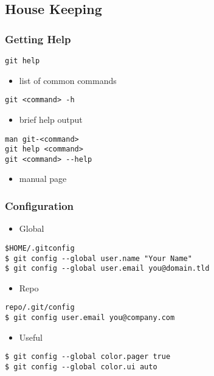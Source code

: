 \documentclass[english]{beamer}
\newcommand{\mysubsection}[2]{%
  \hypertarget{#2}{}%
  \subsection{#1}%
  \label{#2}%
}
\newcommand{\CMD}[1]{%
\texttt{\textcolor{code-blue}{#1}}%
}
\begin{document}
\mysubsection{House Keeping}{using:housekeeping}
\begin{frame}
\frametitle{Getting Help}

\CMD{git help}
\begin{itemize}
        \item list of common commands
\end{itemize}

\vspace{.1\textheight}

\CMD{git <command> -h}
\begin{itemize}
        \item brief help output
\end{itemize}

\vspace{.1\textheight}

\CMD{man git-<command>} \\
\CMD{git help <command>} \\
\CMD{git <command> {-}-help} \\
\begin{itemize}
        \item manual page
\end{itemize}

\end{frame}

\begin{frame}
\frametitle{Configuration}

\begin{itemize}
    \item Global
\end{itemize}

\CMD{\$HOME/.gitconfig} \\
\CMD{\$ git config {-}-global user.name "Your Name"} \\
\CMD{\$ git config {-}-global user.email you@domain.tld}

\begin{itemize}
    \item Repo
\end{itemize}

\CMD{repo/.git/config} \\
\CMD{\$ git config user.email you@company.com}

\begin{itemize}
    \item Useful
\end{itemize}

\CMD{\$ git config {-}-global color.pager true} \\
\CMD{\$ git config {-}-global color.ui auto}

\end{frame}
\end{document}
